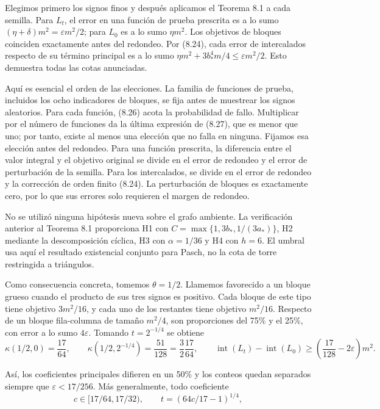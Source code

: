 \documentclass[spanish,11pt,a4paper]{article}
\begin{document}
Elegimos primero los signos finos y después aplicamos el Teorema 8.1 a cada semilla. Para \(L_t\), el error en una función de prueba prescrita es a lo sumo \((\eta+\delta)m^2=\varepsilon m^2/2\); para \(L_0\) es a lo sumo \(\eta m^2\). Los objetivos de bloques coinciden exactamente antes del redondeo. Por (8.24), cada error de intercalados respecto de su término principal es a lo sumo \(\eta m^2+3b_*^4m/4\leq\varepsilon m^2/2\). Esto demuestra todas las cotas anunciadas.

Aquí es esencial el orden de las elecciones. La familia de funciones de prueba, incluidos los ocho indicadores de bloques, se fija antes de muestrear los signos aleatorios. Para cada función, (8.26) acota la probabilidad de fallo. Multiplicar por el número de funciones da la última expresión de (8.27), que es menor que uno; por tanto, existe al menos una elección que no falla en ninguna. Fijamos esa elección antes del redondeo. Para una función prescrita, la diferencia entre el valor integral y el objetivo original se divide en el error de redondeo y el error de perturbación de la semilla. Para los intercalados, se divide en el error de redondeo y la corrección de orden finito (8.24). La perturbación de bloques es exactamente cero, por lo que sus errores solo requieren el margen de redondeo.

No se utilizó ninguna hipótesis nueva sobre el grafo ambiente. La verificación anterior al Teorema 8.1 proporciona H1 con \(C=\max\{1,3b_*,1/(3a_*)\}\), H2 mediante la descomposición cíclica, H3 con \(\alpha=1/36\) y H4 con \(h=6\). El umbral usa aquí el resultado existencial conjunto para Pasch, no la cota de torre restringida a triángulos.

Como consecuencia concreta, tomemos \(\theta=1/2\). Llamemos favorecido a un bloque grueso cuando el producto de sus tres signos es positivo. Cada bloque de este tipo tiene objetivo \(3m^2/16\), y cada uno de los restantes tiene objetivo \(m^2/16\). Respecto de un bloque fila-columna de tamaño \(m^2/4\), son proporciones del 75\% y el 25\%, con error a lo sumo \(4\varepsilon\). Tomando \(t=2^{-1/4}\) se obtiene
\[\kappa(1/2,0)=\frac{17}{64},\qquad
\kappa(1/2,2^{-1/4})=\frac{51}{128}=\frac32\frac{17}{64},
\qquad
\operatorname{int}(L_t)-\operatorname{int}(L_0)
\geq\left(\frac{17}{128}-2\varepsilon\right)m^2.              \tag{8.28}\]

Así, los coeficientes principales difieren en un 50\% y los conteos quedan separados siempre que \(\varepsilon<17/256\). Más generalmente, todo coeficiente
\[c\in[17/64,17/32),\qquad t=(64c/17-1)^{1/4},                \tag{8.29}\]
\end{document}
